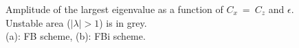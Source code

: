 \documentclass[a4paper]{article}
\numberwithin{equation}{section}
\begin{document}
\begin{figure}[!ht]
   \centering
   \quad
   \caption {Amplitude of the largest eigenvalue as a function of $C_x\ =\ C_z$ and $\epsilon$.\\
   Unstable area ($\mid\lambda\mid >1$) is in grey.\\
   (a): FB scheme, (b): FBi scheme. }
   \label{Figstabsurf}
\end{figure}
\end{document}
